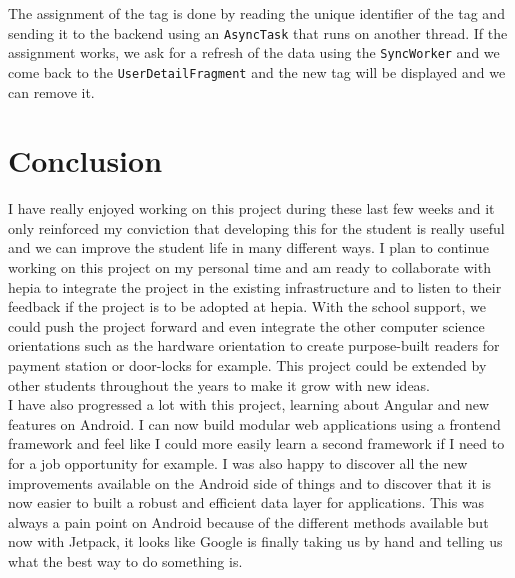\documentclass[twoside, openright,11pt,a4paper]{book}
\begin{document}
The assignment of the tag is done by reading the unique identifier of the tag and sending it to the backend using an \verb+AsyncTask+ that runs on another thread. If the assignment works, we ask for a refresh of the data using the \verb+SyncWorker+ and we come back to the \verb+UserDetailFragment+ and the new tag will be displayed and we can remove it.
\chapter{Conclusion}
I have really enjoyed working on this project during these last few weeks and it only reinforced my conviction that developing this for the student is really useful and we can improve the student life in many different ways. I plan to continue working on this project on my personal time and am ready to collaborate with hepia to integrate the project in the existing infrastructure and to listen to their feedback if the project is to be adopted at hepia. With the school support, we could push the project forward and even integrate the other computer science orientations such as the hardware orientation to create purpose-built readers for payment station or door-locks for example. This project could be extended by other students throughout the years to make it grow with new ideas. \\

I have also progressed a lot with this project, learning about Angular and new features on Android. I can now build modular web applications using a frontend framework and feel like I could more easily learn a second framework if I need to for a job opportunity for example. I was also happy to discover all the new improvements available on the Android side of things and to discover that it is now easier to built a robust and efficient data layer for applications. This was always a pain point on Android because of the different methods available but now with Jetpack, it looks like Google is finally taking us by hand and telling us what the best way to do something is.
\end{document}

